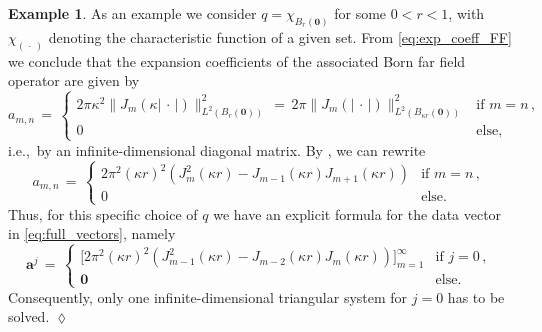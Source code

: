 \documentclass[11pt,a4paper]{article}
\theoremstyle{definition}
\newtheorem{example}[theorem]{Example}
\theoremstyle{remark} \newtheorem{remark}[theorem]{Remark}
\numberwithin{equation}{section}
\numberwithin{figure}{section}
\numberwithin{algorithm}{section}
\numberwithin{table}{section}
\newcommand{\bs}{\boldsymbol}
\newcommand{\bfa}{{\bs a}}
\newcommand{\bfzero}{{\bs 0}}
\newcommand{\ph}{\,\cdot\,}
\begin{document}
\begin{example}
\label{exa:analytic_example}
	As an example we consider $q=\chi_{B_r(\bfzero)}$ for some $0<r<1$, with $\chi_{(\, \cdot \, )}$ denoting the characteristic function of a given set.
	From \eqref{eq:exp_coeff_FF} we conclude that the expansion coefficients of the associated Born far field operator are given by
	\begin{equation*}
		a_{m,n} \,=\, \begin{cases}
		2\pi\kappa ^2\|J_m(\kappa|\ph|)\|^2_{L^2(B_r(\bfzero))} \,=\, 2\pi\|J_m(|\ph|)\|^2_{L^2(B_{\kappa r}(\bfzero))} & \text{if } m=n\,, \\
		0 & \text{else},
		\end{cases}
	\end{equation*}
	i.e.,~by an infinite-dimensional diagonal matrix.
	By \cite[Eq.~(10.22.5)]{NIST:DLMF}, we can rewrite
	\begin{equation*}
		a_{m,n} \,=\, \begin{cases}
		2\pi^2(\kappa r)^2 \left( J^2_m(\kappa r) - J_{m-1}(\kappa r)J_{m+1}(\kappa r)\right) & \text{if } m=n\,, \\
		0 & \text{else}.
		\end{cases}
	\end{equation*}
	Thus, for this specific choice of $q$ we have an explicit formula for the data vector in \eqref{eq:full_vectors}, namely
	\begin{equation*}
		\bfa^j \,=\, \begin{cases}
		\big [2\pi^2(\kappa r)^2 \left( J^2_{m-1}(\kappa r) - J_{m-2}(\kappa r)J_{m}(\kappa r)\right) \big]_{m=1}^{\infty} & \text{if } j=0\,, \\[1mm]
		\bfzero & \text{else}.
		\end{cases}
	\end{equation*}
	Consequently, only one infinite-dimensional triangular system for $j=0$ has to be solved.
     \hfill$\lozenge$
\end{example}
\end{document}

